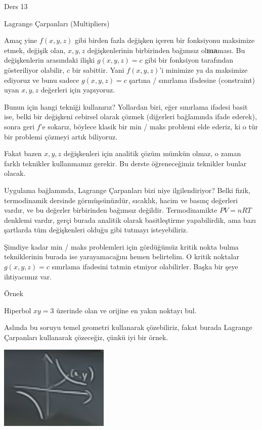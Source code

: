 \documentclass[12pt,fleqn]{article}\usepackage{../../common}
\begin{document}
Ders 13

Lagrange Çarpanları (Multipliers)

Amaç yine $f(x,y,z)$ gibi birden fazla değişken içeren bir fonksiyonu
maksimize etmek, değişik olan, $x,y,z$ değişkenlerinin birbirinden bağımsız
ol\textbf{ma}ması. Bu değişkenlerin arasındaki ilişki $g(x,y,z)=c$ gibi bir
fonksiyon tarafından gösteriliyor olabilir, $c$ bir sabittir. Yani
$f(x,y,z)$'i minimize ya da maksimize ediyoruz ve bunu sadece $g(x,y,z)=c$
şartına / sınırlama ifadesine (constraint) uyan $x,y,z$ değerleri için
yapıyoruz.

Bunun için hangi tekniği kullanırız? Yollardan biri, eğer sınırlama ifadesi
basit ise, belki bir değişkeni cebirsel olarak çözmek (diğerleri
bağlamında ifade ederek), sonra geri $f$'e sokarız, böylece klasik bir min
/ maks problemi elde ederiz, ki o tür bir problemi çözmeyi artık biliyoruz.

Fakat bazen $x,y,z$ değişkenleri için analitik çözüm mümkün olmaz, o zaman
farklı teknikler kullanmamız gerekir. Bu derste öğreneceğimiz teknikler
bunlar olacak. 

Uygulama bağlamında, Lagrange Çarpanları bizi niye ilgilendiriyor? Belki
fizik, termodinamik dersinde görmüşsünüzdür, sıcaklık, hacim ve basınç
değerleri vardır, ve bu değerler birbirinden bağımsız
değildir. Termodinamikte $PV=nRT$ denklemi vardır, gerçi burada analitik
olarak basitleştirme yapabilirdik, ama bazı şartlarda tüm değişkenleri
olduğu gibi tutmayı isteyebiliriz. 

Şimdiye kadar min / maks problemleri için gördüğümüz kritik nokta bulma
tekniklerinin burada ise yarayamacağını hemen belirtelim. O kritik noktalar
$g(x,y,z)=c$ sınırlama ifadesini tatmin etmiyor olabilirler. Başka bir şeye
ihtiyacımız var. 

Örnek

Hiperbol $xy =3$ üzerinde olan ve orijine en yakın noktayı bul. 

Aslında bu soruyu temel geometri kullanarak çözebiliriz, fakat burada
Lagrange Çarpanları kullanarak çözeceğiz, çünkü iyi bir örnek.

\begin{center}
\includegraphics[height=4cm]{13_1.png}
\end{center}
\end{document}
